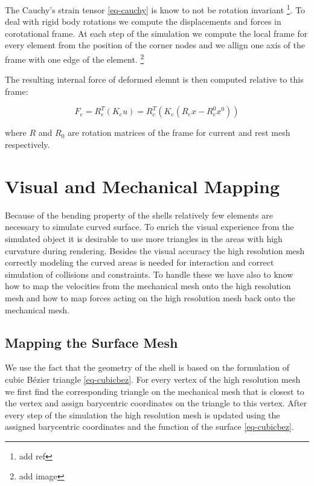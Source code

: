 \documentclass{egpubl}
\begin{document}
The Cauchy's strain tensor \eqref{eq-cauchy} is know to not be rotation
invariant \footnote{add ref}. To deal with rigid body rotations we compute
the displacements and forces in corotational frame. At each step of the
simulation we compute the local frame for every element from the position
of the corner nodes and we allign one axis of the frame with one edge of
the element. \footnote{add image}

The resulting internal force of deformed elemnt is then computed relative
to this frame:

\begin{equation}
    F_e = R_e^T (K_e u) = R_e^T \left(K_e(R_e x - R_e^0 x^0)\right)
\end{equation}

\noindent
where $R$ and $R_0$ are rotation matrices of the frame for current and rest
mesh respectively.


\section{Visual and Mechanical Mapping} %

Because of the bending property of the shells relatively few elements are
necessary to simulate curved surface. To enrich the visual experience from
the simulated object it is desirable to use more triangles in the areas
with high curvature during rendering. Besides the visual accuracy the high
resolution mesh correctly modeling the curved areas is needed for
interaction and correct simulation of collisions and constraints. To handle
these we have also to know how to map the velocities from the mechanical
mesh onto the high resolution mesh and how to map forces acting on the high
resolution mesh back onto the mechanical mesh.

\subsection{Mapping the Surface Mesh}

We use the fact that the geometry of the shell is based on the formulation
of cubic Bézier triangle \eqref{eq-cubicbez}. For every vertex of the high
resolution mesh we first find the corresponding triangle on the mechanical
mesh that is closest to the vertex and assign barycentric coordinates on
the triangle to this vertex. After every step of the simulation the high
resolution mesh is updated using the assigned barycentric coordinates and
the function of the surface \eqref{eq-cubicbez}.
\end{document}

